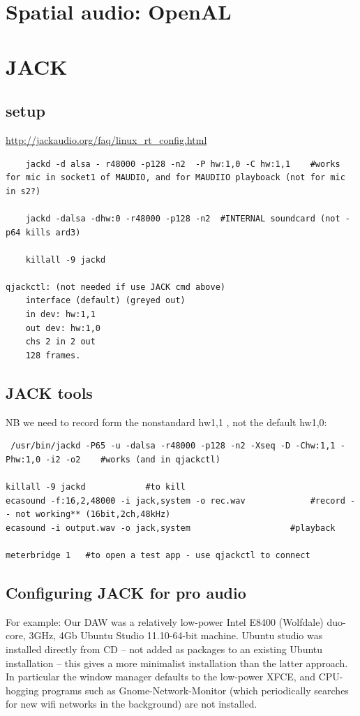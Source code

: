 \documentclass[oneside,english]{scrbook}
\begin{document}
\chapter{Spatial audio: OpenAL}

\chapter{JACK}

\section{setup}
\url{http://jackaudio.org/faq/linux_rt_config.html}

\begin{lstlisting}
    jackd -d alsa - r48000 -p128 -n2  -P hw:1,0 -C hw:1,1    #works for mic in socket1 of MAUDIO, and for MAUDIIO playboack (not for mic in s2?)

	jackd -dalsa -dhw:0 -r48000 -p128 -n2  #INTERNAL soundcard (not -p64 kills ard3)
	
	killall -9 jackd

qjackctl: (not needed if use JACK cmd above)
	interface (default) (greyed out)
	in dev: hw:1,1
	out dev: hw:1,0	
	chs 2 in 2 out
	128 frames.
\end{lstlisting}

\section{JACK tools}
NB we need to record form the nonstandard hw1,1 , not the default hw1,0:

\begin{lstlisting}
 /usr/bin/jackd -P65 -u -dalsa -r48000 -p128 -n2 -Xseq -D -Chw:1,1 -Phw:1,0 -i2 -o2    #works (and in qjackctl)

killall -9 jackd			#to kill
ecasound -f:16,2,48000 -i jack,system -o rec.wav  			 #record -- not working** (16bit,2ch,48kHz)
ecasound -i output.wav -o jack,system 					 #playback

meterbridge 1   #to open a test app - use qjackctl to connect
\end{lstlisting}

\section{Configuring JACK for pro audio}

For example: Our DAW was a relatively low-power Intel E8400 (Wolfdale) duo-core, 3GHz, 4Gb Ubuntu Studio 11.10-64-bit machine.   Ubuntu studio was installed directly from CD -- not added as packages to an existing Ubuntu installation -- this gives a more minimalist installation than the latter approach.  In particular the window manager defaults to the low-power XFCE, and CPU-hogging programs such as Gnome-Network-Monitor (which periodically searches for new wifi networks in the background) are not installed.
\end{document}
